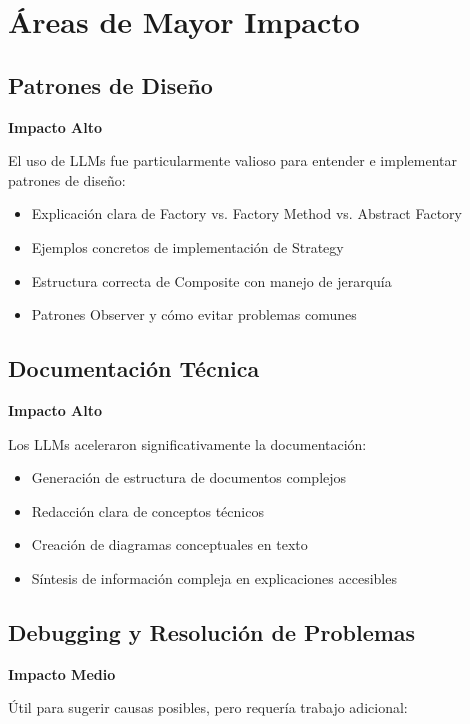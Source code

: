 \documentclass[12pt, a4paper]{article}
\begin{document}
\section{Áreas de Mayor Impacto}

\subsection{Patrones de Diseño}

\textbf{Impacto Alto}

El uso de LLMs fue particularmente valioso para entender e implementar patrones de diseño:

\begin{itemize}[leftmargin=2em]
    \item Explicación clara de Factory vs. Factory Method vs. Abstract Factory
    \item Ejemplos concretos de implementación de Strategy
    \item Estructura correcta de Composite con manejo de jerarquía
    \item Patrones Observer y cómo evitar problemas comunes
\end{itemize}

\subsection{Documentación Técnica}

\textbf{Impacto Alto}

Los LLMs aceleraron significativamente la documentación:

\begin{itemize}[leftmargin=2em]
    \item Generación de estructura de documentos complejos
    \item Redacción clara de conceptos técnicos
    \item Creación de diagramas conceptuales en texto
    \item Síntesis de información compleja en explicaciones accesibles
\end{itemize}

\subsection{Debugging y Resolución de Problemas}

\textbf{Impacto Medio}

Útil para sugerir causas posibles, pero requería trabajo adicional:
\end{document}
